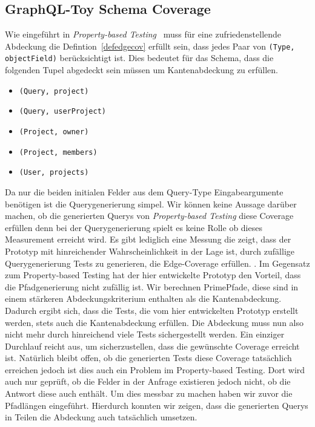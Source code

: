 \subsection{GraphQL-Toy Schema Coverage}

Wie eingeführt in \textit{Property-based Testing}~\cite{property-based-testing} muss für eine zufriedenstellende Abdeckung
die Defintion~\ref{defedgecov} erfüllt sein, dass jedes Paar von \verb+(Type, objectField)+ berücksichtigt ist.
Dies bedeutet für das Schema, dass die folgenden Tupel abgedeckt sein müssen um Kantenabdeckung zu erfüllen.
    \begin{itemize}
        \item \verb+(Query, project)+
        \item \verb+(Query, userProject)+
        \item \verb+(Project, owner)+
        \item \verb+(Project, members)+
        \item \verb+(User, projects)+
    \end{itemize}

Da nur die beiden initialen Felder aus dem Query-Type Eingabeargumente benötigen ist die Querygenerierung simpel.
Wir können keine Aussage darüber machen, ob die generierten Querys von \textit{Property-based Testing}\cite{property-based-testing} diese Coverage erfüllen denn bei der Querygenerierung spielt es keine Rolle ob dieses Measurement erreicht wird.
Es gibt lediglich eine Messung die zeigt, dass der Prototyp mit hinreichender Wahrscheinlichkeit in der Lage ist, durch zufällige Querygenerierung Tests zu generieren, die Edge-Coverage erfüllen. \cite[vgl. D.Results RQ1 ]{property-based-testing}.
Im Gegensatz zum Property-based Testing hat der hier entwickelte Prototyp den Vorteil, dass die Pfadgenerierung nicht zufällig ist.
Wir berechnen PrimePfade, diese sind in einem stärkeren Abdeckungskriterium enthalten als die Kantenabdeckung.
Dadurch ergibt sich, dass die Tests, die vom hier entwickelten Prototyp erstellt werden, stets auch die Kantenabdeckung erfüllen.
Die Abdeckung muss nun also nicht mehr durch hinreichend viele Tests sichergestellt werden.
Ein einziger Durchlauf reicht aus, um sicherzustellen, dass die gewünschte Coverage erreicht ist.
Natürlich bleibt offen, ob die generierten Tests diese Coverage tatsächlich erreichen jedoch ist dies auch ein Problem im Property-based Testing.
Dort wird auch nur geprüft, ob die Felder in der Anfrage existieren jedoch nicht, ob die Antwort diese auch enthält.
Um dies messbar zu machen haben wir zuvor die Pfadlängen eingeführt.
Hierdurch konnten wir zeigen, dass die generierten Querys in Teilen die Abdeckung auch tatsächlich umsetzen.

